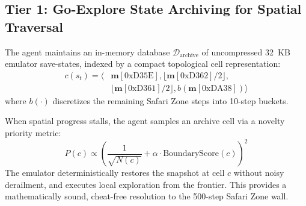 \documentclass[journal,10pt,twocolumn]{IEEEtran}
\begin{document}
\subsection{Tier 1: Go-Explore State Archiving for Spatial Traversal}
The agent maintains an in-memory database $\mathcal{D}_{\text{archive}}$ of uncompressed 32~KB emulator save-states, indexed by a compact topological cell representation:
\begin{equation}
\begin{split}
c(s_t) = \langle &\mathbf{m}[\text{0xD35E}], \lfloor \mathbf{m}[\text{0xD362}] / 2 \rfloor, \\
&\lfloor \mathbf{m}[\text{0xD361}] / 2 \rfloor, b(\mathbf{m}[\text{0xDA38}]) \rangle
\end{split}
\end{equation}
where $b(\cdot)$ discretizes the remaining Safari Zone steps into 10-step buckets. 

When spatial progress stalls, the agent samples an archive cell via a novelty priority metric:
\begin{equation}
P(c) \propto \left( \frac{1}{\sqrt{N(c)}} + \alpha \cdot \text{BoundaryScore}(c) \right)^2
\end{equation}
The emulator deterministically restores the snapshot at cell $c$ without noisy derailment, and executes local exploration from the frontier. This provides a mathematically sound, cheat-free resolution to the 500-step Safari Zone wall.
\end{document}
